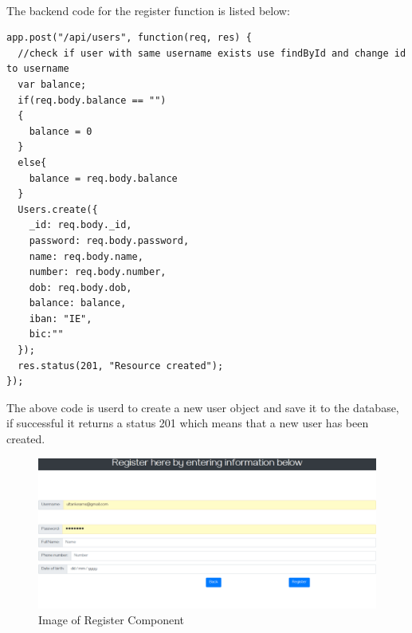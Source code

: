 \\
The backend code for the register function is listed below:
\begin{verbatim}
app.post("/api/users", function(req, res) {
  //check if user with same username exists use findById and change id to username
  var balance;
  if(req.body.balance == "")
  {
    balance = 0
  }
  else{
    balance = req.body.balance
  }
  Users.create({
    _id: req.body._id,
    password: req.body.password,
    name: req.body.name,
    number: req.body.number,
    dob: req.body.dob,
    balance: balance,
    iban: "IE",
    bic:""
  });
  res.status(201, "Resource created");
});
\end{verbatim}
The above code is userd to create a new user object and save it to the database, if successful it returns a status 201 which means that a new user has been created.
\begin{figure}[H]
\includegraphics[width=\textwidth]{img/registercomponent.png}
\caption{Image of Register Component}
\label{fig:Image of register component}
\end{figure}
